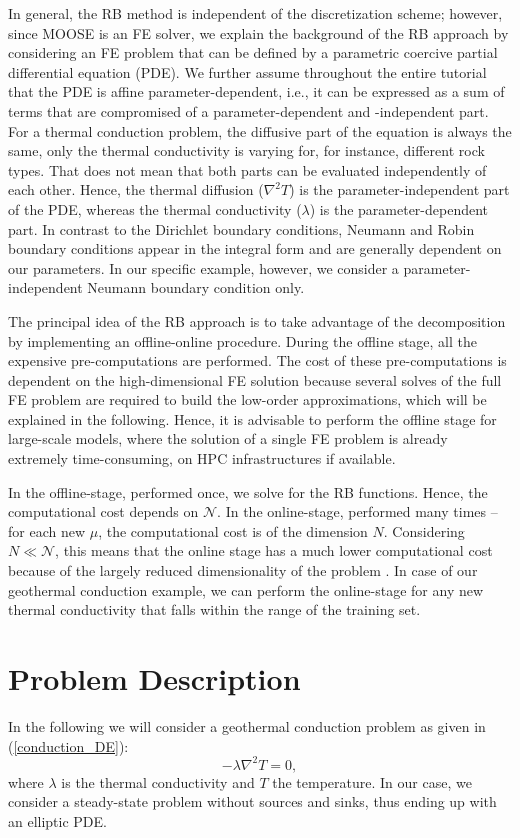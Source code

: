 \documentclass[11pt, a4paper, DIV=14]{scrartcl}
\begin{document}
In general, the RB method is independent of the discretization scheme; however, since MOOSE is an FE solver, we explain the background of the RB approach by considering an FE problem that can be defined by a parametric coercive partial differential equation (PDE). We further assume throughout the entire tutorial that the PDE is affine parameter-dependent,  i.e., it can be expressed as a sum of terms that are compromised of a parameter-dependent and -independent part. For a thermal conduction problem, the diffusive part of the equation is always the same, only the thermal conductivity is varying for, for instance, different rock types. That does not mean that both parts can be evaluated independently of each other. Hence, the thermal diffusion ($\nabla^2 T$) is the parameter-independent part of the PDE, whereas the thermal conductivity ($\lambda$) is the parameter-dependent part.  In contrast to the Dirichlet boundary conditions, Neumann and Robin boundary conditions appear in the integral form and are generally dependent on our parameters. In our specific example, however, we consider a parameter-independent Neumann boundary condition only.

The principal idea of the RB approach is to take advantage of the decomposition by implementing an offline-online procedure. During the offline stage, all the expensive pre-computations are performed. The cost of these pre-computations is dependent on the high-dimensional FE solution because several solves of the full FE problem are required to build the low-order approximations, which will be explained in the following. Hence, it is advisable to perform the offline stage for large-scale models, where the solution of a single FE problem is already extremely time-consuming, on HPC infrastructures if available.

In the offline-stage, performed once, we solve for the RB functions. Hence, the computational cost depends on $\mathcal{N}$. In the online-stage, performed many times -- for each new $\mu$, the computational cost is of the dimension $N$. Considering $N \ll \mathcal{N}$, this means that the online stage has a much lower computational cost because of the largely reduced dimensionality of the problem \cite{prud_et_al, veroy2005, quarteroni_et_al, hest_et_al}. In case of our geothermal conduction example, we can perform the online-stage for any new thermal conductivity that falls within the range of the training set. 

\section{Problem Description}
In the following we will consider a geothermal conduction problem as given in (\ref{conduction_DE}):
\begin{equation}
- \lambda \nabla^2 T = 0,
\label{conduction_DE}
\end{equation}
%
where $\lambda$ is the thermal conductivity and $T$ the temperature. In our case, we consider a steady-state problem without sources and sinks, thus ending up with an elliptic PDE.
\end{document}

